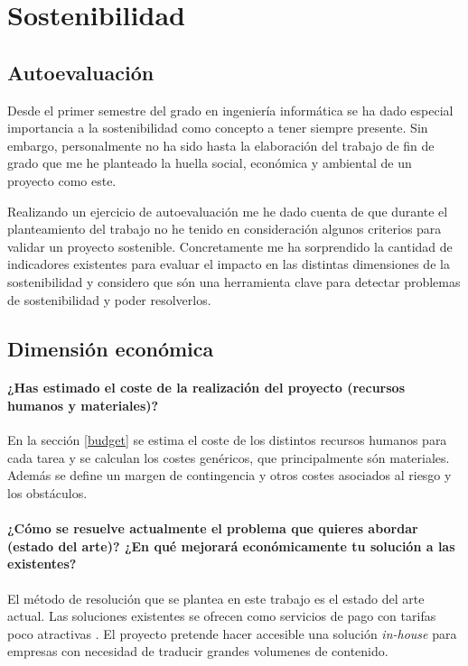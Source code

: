 \chapter{Sostenibilidad}
\section{Autoevaluación}
Desde el primer semestre del grado en ingeniería informática se ha dado especial importancia a
la sostenibilidad como concepto a tener siempre presente. Sin embargo, personalmente no ha sido hasta
la elaboración del trabajo de fin de grado que me he planteado la huella social, económica y 
ambiental de un proyecto como este.

Realizando un ejercicio de autoevaluación me he dado cuenta de que durante el planteamiento del
trabajo no he tenido en consideración algunos criterios para validar un
proyecto sostenible. Concretamente me ha sorprendido la cantidad de indicadores existentes
para evaluar el impacto en las distintas dimensiones de la sostenibilidad y considero que
són una herramienta clave para detectar problemas de sostenibilidad y poder resolverlos.

\section{Dimensión económica}
\subsubsection{¿Has estimado el coste de la realización del proyecto (recursos humanos y materiales)?}

En la sección \ref{budget} se estima el coste de los distintos recursos humanos para cada
tarea y se calculan los costes genéricos, que principalmente són materiales.
Además se define un margen de contingencia y otros costes asociados al riesgo y los obstáculos.

\subsubsection{¿Cómo se resuelve actualmente el problema que quieres abordar (estado del arte)?
¿En qué mejorará económicamente tu solución a las existentes?}

El método de resolución que se plantea en este trabajo es el estado del arte actual.
Las soluciones existentes se ofrecen como servicios de pago con tarifas poco atractivas
\cite{GoogleTranslatePricing,AWSTranslatePricing,MicrosoftTranslatePricing}. El proyecto pretende
hacer accesible una solución \textit{in-house} para empresas con necesidad de traducir grandes
volumenes de contenido.

